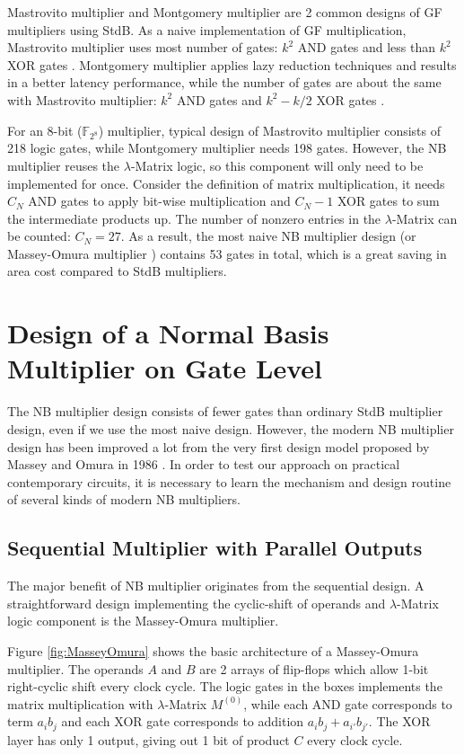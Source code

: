 
Mastrovito multiplier \cite{mastro:1989} and Montgomery multiplier \cite{PT:1985} are 2 common designs
of GF multipliers using StdB. As a naive implementation of GF multiplication,
Mastrovito multiplier uses most number of gates:
$k^2$ AND gates and less than $k^2$ XOR gates \cite{Mastrovito}. Montgomery multiplier 
applies lazy reduction techniques and results in a better latency performance, while the number of gates are about
the same with Mastrovito multiplier:
$k^2$ AND gates and $k^2-k/2$ XOR gates \cite{wu:2002}. 

For an 8-bit ($\mathbb F_{2^8}$) multiplier, typical design of Mastrovito multiplier consists of 218 logic gates, while 
Montgomery multiplier needs 198 gates. However, the NB multiplier reuses the $\lambda$-Matrix 
logic, so this component will only need to be implemented for once. 
Consider the definition of matrix multiplication, it needs $C_N$ AND gates to apply 
bit-wise multiplication and $C_N-1$ XOR gates to sum the intermediate products up. The number of nonzero entries
in the $\lambda$-Matrix can be counted: $C_N = 27$.
As a result, the most naive NB multiplier design (or Massey-Omura multiplier \cite{MasseyOmura})
contains 53 gates in total, which is a great saving in area cost compared to StdB multipliers.

\section{Design of a Normal Basis Multiplier on Gate Level}
\label{sec:nbdesign}
The NB multiplier design consists of fewer gates than ordinary StdB multiplier design, even if 
we use the most naive design. However, the modern NB multiplier design has been improved a lot from the 
very first design model proposed by Massey and Omura in 1986 \cite{MasseyOmura}. In order to 
test our approach on practical contemporary circuits, it is necessary to learn the mechanism and design 
routine of several kinds of modern NB multipliers.
\subsection{Sequential Multiplier with Parallel Outputs}
The major benefit of NB multiplier originates from the sequential design. A straightforward design implementing 
the cyclic-shift of operands and $\lambda$-Matrix logic component is the Massey-Omura multiplier.

Figure \ref{fig:MasseyOmura} shows the basic architecture of a Massey-Omura multiplier. The operands
$A$ and $B$ are 2 arrays of flip-flops which allow 1-bit right-cyclic shift every clock cycle.
The logic gates in the boxes implements the matrix multiplication with $\lambda$-Matrix $M^{(0)}$, 
while each AND gate corresponds to term $a_ib_j$ and each XOR gate corresponds to addition $a_ib_j+a_{i'}b_{j'}$. 
The XOR layer has only 1 output, giving out 1 bit of product $C$ every clock cycle.

